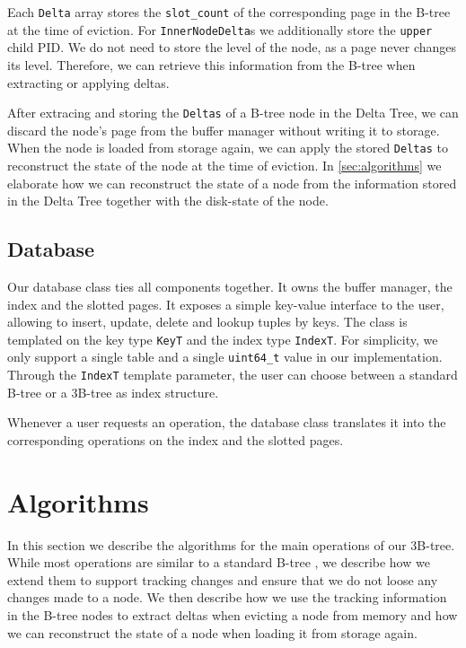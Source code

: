 Each \texttt{Delta} array stores the \texttt{slot\_count} of the corresponding page in the B-tree at the time of eviction.
For \texttt{InnerNodeDelta}s we additionally store the \texttt{upper} child \ac{PID}.
We do not need to store the level of the node, as a page never changes its level. 
Therefore, we can retrieve this information from the B-tree when extracting or applying deltas.

After extracing and storing the \texttt{Deltas} of a B-tree node in the Delta Tree, we can discard the node's page from the buffer manager without writing it to storage.
When the node is loaded from storage again, we can apply the stored \texttt{Deltas} to reconstruct the state of the node at the time of eviction.
In \autoref{sec:algorithms} we elaborate how we can reconstruct the state of a node from the information stored in the Delta Tree together with the disk-state of the node.

\subsection*{Database}
Our database class ties all components together.
It owns the buffer manager, the index and the slotted pages.
It exposes a simple key-value interface to the user, allowing to insert, update, delete and lookup tuples by keys.
The class is templated on the key type \texttt{KeyT} and the index type \texttt{IndexT}.
For simplicity, we only support a single table and a single \texttt{uint64\_t} value in our implementation.
Through the \texttt{IndexT} template parameter, the user can choose between a standard B-tree or a 3B-tree as index structure.

Whenever a user requests an operation, the database class translates it into the corresponding operations on the index and the slotted pages.

\section{Algorithms}
\label{sec:algorithms}
In this section we describe the algorithms for the main operations of our 3B-tree.
While most operations are similar to a standard B-tree \cite{mdbs2024slides}, we describe how we extend them to support tracking changes and ensure that we do not loose any changes made to a node.
We then describe how we use the tracking information in the B-tree nodes to extract deltas when evicting a node from memory and how we can reconstruct the state of a node when loading it from storage again.

